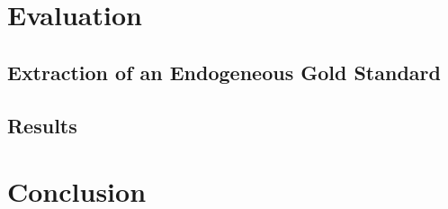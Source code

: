 \documentclass{beamer}
\begin{document}
\section{Evaluation}

\subsection{Extraction of an Endogeneous Gold Standard}

\subsection{Results}

\section{Conclusion}

\end{document}
